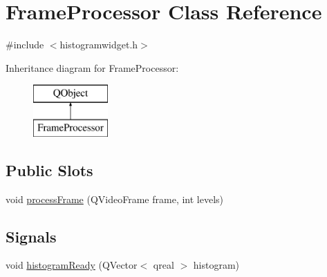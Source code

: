 \hypertarget{class_frame_processor}{\section{Frame\-Processor Class Reference}
\label{class_frame_processor}
}


{\ttfamily \#include $<$histogramwidget.\-h$>$}

Inheritance diagram for Frame\-Processor\-:\begin{figure}[H]
\begin{center}
\leavevmode
\includegraphics[height=2.000000cm]{class_frame_processor}
\end{center}
\end{figure}
\subsection*{Public Slots}
\begin{DoxyCompactItemize}
\item 
void \hyperlink{class_frame_processor_af621919692c3e1bf036ea9c26d9413bf}{process\-Frame} (Q\-Video\-Frame frame, int levels)
\end{DoxyCompactItemize}
\subsection*{Signals}
\begin{DoxyCompactItemize}
\item 
void \hyperlink{class_frame_processor_a67cb2144c8f68233b238ad24f280b7d7}{histogram\-Ready} (Q\-Vector$<$ qreal $>$ histogram)
\end{DoxyCompactItemize}


